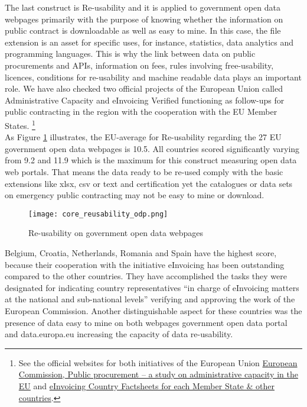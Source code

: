 \documentclass[a4paper, twoside]{report}
\let\oldfootnote\footnote
\renewcommand\footnote[1]{%
\oldfootnote{\hspace{2mm}#1}}
\begin{document}
The last construct is Re-usability and it is applied to government open data webpages primarily with the purpose of knowing whether the information on public contract is downloadable as well as easy to mine. In this case, the file extension is an asset for specific uses, for instance, statistics, data analytics and programming languages. This is why the link between data on public procurements and APIs, information on fees, rules involving free-usability, licences, conditions for re-usability and machine readable data plays an important role. We have also checked two official projects of the European Union called Administrative Capacity and eInvoicing Verified functioning as follow-ups for public contracting in the region with the cooperation with the EU Member States.\footnote{See the official websites for both initiatives of the European Union \href{https://ec.europa.eu/regional_policy/en/policy/how/improving-investment/public-procurement/study/\#12}{European Commission, Public procurement – a study on administrative capacity in the EU} and \href{https://ec.europa.eu/digital-building-blocks/wikis/display/DIGITAL/eInvoicing+Country+Factsheets+for+each+Member+State+and+other+countries}{eInvoicing Country Factsheets for each Member State \& other countries}.}\\

As Figure \ref{fig:core_reusability_odp} illustrates, the EU-average for Re-usability regarding the 27 EU government open data webpages is 10.5. All countries scored significantly varying from 9.2 and 11.9 which is the maximum for this construct measuring open data web portals. That means the data ready to be re-used comply with the basic extensions like xlsx, csv or text and certification yet the catalogues or data sets on emergency public contracting may not be easy to mine or download. 

\begin{figure}[H]
\centering
	\caption{Re-usability on government open data webpages}
	\texttt{[image: core\_reusability\_odp.png]}
	\label{fig:core_reusability_odp}
\end{figure}

Belgium, Croatia, Netherlands, Romania and Spain have the highest score, because their cooperation with the initiative eInvoicing has been outstanding compared to the other countries. They have accomplished the tasks they were designated for indicating country representatives ``in charge of eInvoicing matters at the national and sub-national levels'' verifying and approving the work of the European Commission. Another distinguishable aspect for these countries was the presence of data easy to mine on both webpages government open data portal and data.europa.eu increasing the capacity of data re-usability.\\  
\end{document}
